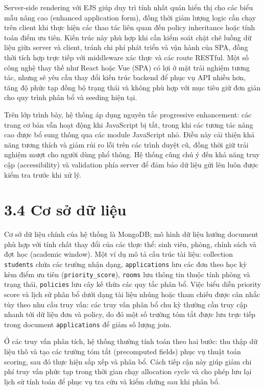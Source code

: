 \documentclass[a4paper,12pt,openany,oneside]{report}
\begin{document}
Server-side rendering với EJS giúp duy trì tính nhất quán hiển thị cho các biểu mẫu nâng cao (enhanced application form), đồng thời giảm lượng logic cần chạy trên client khi thực hiện các thao tác liên quan đến policy inheritance hoặc tính toán điểm ưu tiên. Kiến trúc này phù hợp khi cần kiểm soát chặt chẽ luồng dữ liệu giữa server và client, tránh chi phí phát triển và vận hành của SPA, đồng thời tích hợp trực tiếp với middleware xác thực và các route RESTful. Một số công nghệ thay thế như React hoặc Vue (SPA) có lợi ở mặt trải nghiệm tương tác, nhưng sẽ yêu cầu thay đổi kiến trúc backend để phục vụ API nhiều hơn, tăng độ phức tạp đồng bộ trạng thái và không phù hợp với mục tiêu giữ đơn giản cho quy trình phân bổ và seeding hiện tại.

Trên lớp trình bày, hệ thống áp dụng nguyên tắc progressive enhancement: các trang cơ bản vẫn hoạt động khi JavaScript bị tắt, trong khi các tương tác nâng cao được bổ sung thông qua các module JavaScript nhỏ. Điều này cải thiện khả năng tương thích và giảm rủi ro lỗi trên các trình duyệt cũ, đồng thời giữ trải nghiệm mượt cho người dùng phổ thông. Hệ thống cũng chú ý đến khả năng truy cập (accessibility) và validation phía server để đảm bảo dữ liệu gửi lên luôn được kiểm tra trước khi xử lý.

\section*{3.4 Cơ sở dữ liệu}
Cơ sở dữ liệu chính của hệ thống là MongoDB; mô hình dữ liệu hướng document phù hợp với tính chất thay đổi của các thực thể: sinh viên, phòng, chính sách và đợt học (academic window). Một ví dụ mô tả cấu trúc tài liệu: collection \texttt{students} chứa các trường nhận dạng, \texttt{applications} lưu các đơn theo học kỳ kèm điểm ưu tiên (\texttt{priority\_score}), \texttt{rooms} lưu thông tin thuộc tính phòng và trạng thái, \texttt{policies} lưu cây kế thừa các quy tắc phân bổ. Việc biểu diễn priority score và lịch sử phân bổ dưới dạng tài liệu nhúng hoặc tham chiếu được cân nhắc tùy theo nhu cầu truy vấn: các truy vấn phân bổ chu kỳ thường cần truy cập nhanh tới dữ liệu đơn và policy, do đó một số trường tóm tắt được lưu trực tiếp trong document \texttt{applications} để giảm số lượng join.

Ở các truy vấn phân tích, hệ thống thường tính toán theo hai bước: thu thập dữ liệu thô và tạo các trường tóm tắt (precomputed fields) phục vụ thuật toán scoring, sau đó thực hiện sắp xếp và phân bổ. Cách tiếp cận này giúp giảm chi phí truy vấn phức tạp trong thời gian chạy allocation cycle và cho phép lưu lại lịch sử tính toán để phục vụ tra cứu và kiểm chứng sau khi phân bổ.
\end{document}
